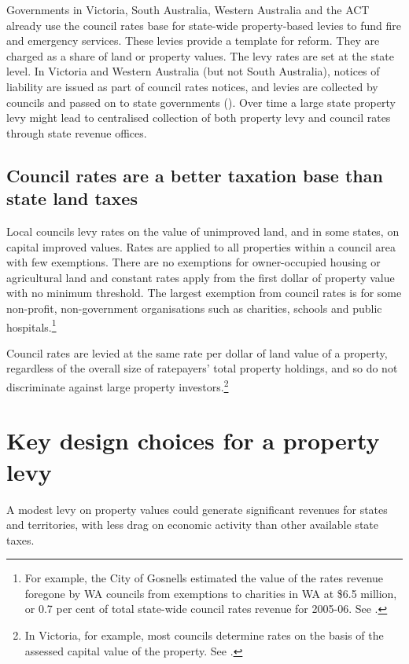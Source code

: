 \documentclass[twoside,english]{grattanBudgetRepairb5portrait}
\begin{document}
Governments in Victoria, South Australia, Western Australia and the ACT already use the council rates base for state-wide property-based levies to fund fire and emergency services. These levies provide a template for reform. They are charged as a share of land or property values. The levy rates are set at the state level. In Victoria and Western Australia (but not South Australia), notices of liability are issued as part of council rates notices, and levies are collected by councils and passed on to state governments (). Over time a large state property levy might lead to centralised collection of both property levy and council rates through state revenue offices.

\section{\label{sec:PROP-5-2}Council rates are a better taxation base than state land taxes}
Local councils levy rates on the value of unimproved land, and in some states, on capital improved values. Rates are applied to all properties within a council area with few exemptions. There are no exemptions for owner-occupied housing or agricultural land and constant rates apply from the first dollar of property value with no minimum threshold. The largest exemption from council rates is for some non-profit, non-government organisations such as charities, schools and public hospitals.\footnote{For example, the City of Gosnells estimated the value of the rates revenue foregone by WA councils from exemptions to charities in WA at \$6.5 million, or 0.7 per cent of total state-wide council rates revenue for 2005-06. See \textcite[][107]{productivity2008assessing}.}

Council rates are levied at the same rate per dollar of land value of a property, regardless of the overall size of ratepayers’ total property holdings, and so do not discriminate against large property investors.\footnote{In Victoria, for example, most councils determine rates on the basis of the assessed capital value of the property. See \textcite[][154]{HefferanBoyd2010}.}  

\chapter{Key design choices for a property levy}
A modest levy on property values could generate significant revenues for states and territories, with less drag on economic activity than other available state taxes.
\end{document}

